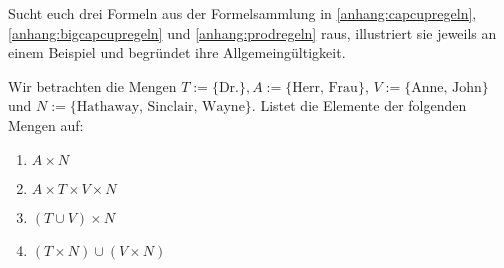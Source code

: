 \begin{aufg}
    Sucht euch drei Formeln aus der Formelsammlung in \cref{anhang:capcupregeln}, \cref{anhang:bigcapcupregeln} und \cref{anhang:prodregeln} raus, illustriert sie jeweils an einem Beispiel und begründet ihre Allgemeingültigkeit.
\end{aufg}


\begin{aufg}
    Wir betrachten die Mengen $T := \{ \text{Dr.} \}, A := \{ \text{Herr, Frau} \}$, $V:= \{ \text{Anne, John} \}$ und $N := \{ \text{Hathaway, Sinclair, Wayne} \}$. Listet die Elemente der folgenden Mengen auf:
    \begin{enumerate}
	\item $A \times N$
	\item $A\times T \times V\times N$
	\item $(T \cup V) \times N$
	\item $(T\times N)\cup (V\times N)$
    \end{enumerate}
\end{aufg}

